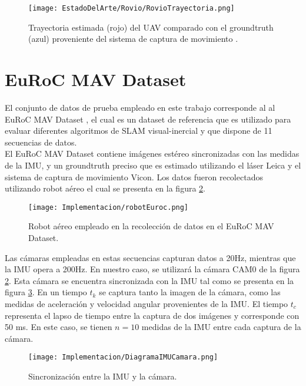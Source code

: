 \begin{figure}[H]
	\centering
	\texttt{[image: EstadoDelArte/Rovio/RovioTrayectoria.png]}
	\caption[Trayectoria estimada utilizando ROVIO]{Trayectoria estimada (rojo) del UAV comparado con el groundtruth (azul) proveniente del sistema de captura de movimiento .}
	\label{fig:RovioTrayectoria}
\end{figure}



\section{EuRoC MAV Dataset}

El conjunto de datos de prueba empleado en este trabajo corresponde al al EuRoC MAV Dataset \cite{euroc}, el cual es un dataset de referencia que es utilizado para evaluar diferentes algoritmos de SLAM visual-inercial y que dispone de 11 secuencias de datos. \\


El EuRoC MAV Dataset contiene imágenes estéreo sincronizadas con las medidas de la IMU,  y un groundtruth preciso que es estimado utilizando el láser Leica y el sistema de captura de movimiento Vicon. Los datos fueron recolectados utilizando robot aéreo el cual se presenta en la figura \ref{fig:robotEuroc}. \\

\begin{figure}[H]
	\centering
	\texttt{[image: Implementacion/robotEuroc.png]}
	\caption[Robot aéreo empleado en la recolección de datos en el EuRoC MAV Dataset]{Robot aéreo empleado en la recolección de datos en el EuRoC MAV Dataset.}
	\label{fig:robotEuroc}
\end{figure}

Las cámaras empleadas en estas secuencias capturan datos a 20Hz, mientras que la IMU opera a 200Hz. En nuestro caso, se utilizará la cámara CAM0 de la figura \ref{fig:robotEuroc}. Esta cámara se encuentra sincronizada con la IMU tal como se presenta en la figura \ref{fig:sincronizacionEuroc}. En un tiempo $t_k$ se captura tanto la imagen de la cámara, como las medidas de aceleración y velocidad angular provenientes de la IMU. El tiempo $t_c$ representa el lapso de tiempo entre la captura de dos imágenes y corresponde con 50 ms. En este caso, se tienen $n = 10$ medidas de la IMU entre cada captura de la cámara. \\

\begin{figure}[H]
	\centering
	\texttt{[image: Implementacion/DiagramaIMUCamara.png]}
	\caption[Sincronización entre la IMU y la cámara]{Sincronización entre la IMU y la cámara.}
	\label{fig:sincronizacionEuroc}
\end{figure}

